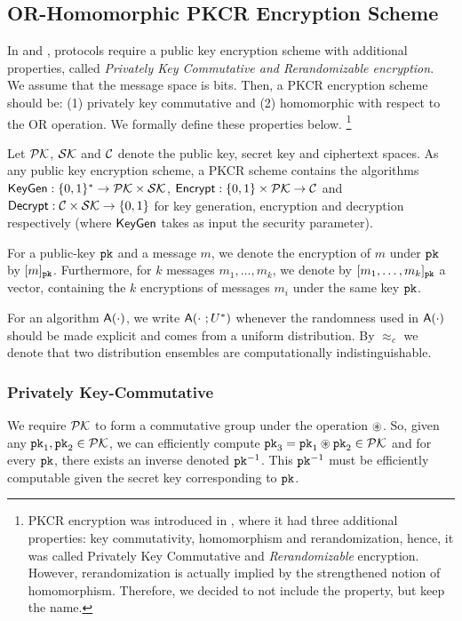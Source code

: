 \subsection{OR-Homomorphic PKCR Encryption Scheme}\label{sec:pkcr-desc}
In \cite{C:AkaLaVMor17} and \cite{EC:AkaMor17}, protocols require a public key encryption scheme with additional properties, called \emph{Privately Key Commutative and Rerandomizable encryption}.
We assume that the message space is bits. Then, a PKCR encryption scheme should be: (1) privately key commutative and (2) homomorphic with respect to the OR operation. We formally define these properties below.
\footnote{PKCR encryption was introduced in \cite{EC:AkaMor17,C:AkaLaVMor17}, where it had three additional properties: key commutativity, homomorphism and rerandomization, hence, it was called Privately Key Commutative and \emph{Rerandomizable} encryption. However, rerandomization is actually implied by the strengthened notion of homomorphism. Therefore, we decided to not include the property, but keep the name.}

Let $\mathcal{PK}$, $\mathcal{SK}$ and $\mathcal{C}$ denote the public key, secret key and ciphertext spaces. As any public key encryption scheme, a PKCR scheme contains the algorithms $\textsf{KeyGen}:\{0,1\}^* \to \mathcal{PK} \times \mathcal{SK}$, $\textsf{Encrypt}:\{0,1\} \times \mathcal{PK} \to \mathcal{C}$ and $\textsf{Decrypt}:\mathcal{C} \times \mathcal{SK} \to \{0,1\}$ for key generation, encryption and decryption respectively (where $\textsf{KeyGen}$ takes as input the security parameter).

For a public-key $\texttt{pk}$ and a message $m$, we denote the encryption of $m$ under $\texttt{pk}$ by $[m]_{\texttt{pk}}$. Furthermore, for $k$ messages $m_1,\dots,m_k$, we denote by $[m_1,\dots,m_k]_{\texttt{pk}}$ a vector, containing the $k$ encryptions of messages $m_i$ under the same key $\texttt{pk}$.

For an algorithm $\textsf{A}(\cdot)$, we write $\textsf{A}(\cdot \ ;U^*)$ whenever the randomness used in $\textsf{A}(\cdot)$ should be made explicit and comes from a uniform distribution. By $\approx_c$ we denote that two distribution ensembles are computationally indistinguishable.

\subsubsection{Privately Key-Commutative}
We require $\mathcal{PK}$ to form a commutative group under the operation $\circledast$. So, given any $\texttt{pk}_1, \texttt{pk}_2 \in \mathcal{PK}$, we can efficiently compute $\texttt{pk}_3 = \texttt{pk}_1 \circledast \texttt{pk}_2 \in \mathcal{PK}$ and for every $\texttt{pk}$, there exists an inverse denoted $\texttt{pk}^{-1}$. 
This $\texttt{pk}^{-1}$ must be efficiently computable given the secret key corresponding to $\texttt{pk}$.

